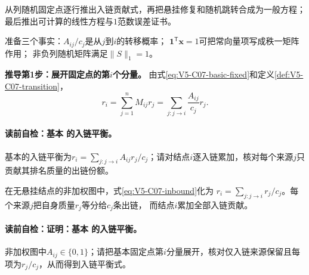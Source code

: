 \label{struct:V5-C07-CH11}

\begin{derivationgoalbox}
从列随机固定点逐行推出入链贡献式，再把悬挂修复和随机跳转合成为一般\PageRank{}方程；
最后推出可计算的线性方程与$1$范数误差证书。
\end{derivationgoalbox}
\begin{derivationprepbox}
准备三个事实：$A_{ij}/c_j$是从$j$到$i$的转移概率；
$\boldsymbol1^{\mathsf T}\boldsymbol x=1$可把常向量项写成秩一矩阵作用；
非负列随机矩阵满足$\|S\|_1=1$。
\end{derivationprepbox}

\textbf{推导第1步：展开固定点的第$i$个分量。}
由式\eqref{eq:V5-C07-basic-fixed}和定义\ref{def:V5-C07-transition}，
\begin{equation}
r_i=\sum_{j=1}^nM_{ij}r_j
=\sum_{j:j\to i}\frac{A_{ij}}{c_j}r_j.
\label{eq:V5-C07-inbound}
\end{equation}
\paragraph{读前自检：基本 的入链平衡。}基本\PageRank{}的入链平衡为$r_i=\sum_{j:j\to i}A_{ij}r_j/c_j$；请对结点$i$逐入链累加，核对每个来源$j$只贡献其排名质量的出链份额。\par

\begin{proposition}\label{prop:V5-C07-inbound-balance}
在无悬挂结点的非加权图中，式\eqref{eq:V5-C07-inbound}化为
$r_i=\sum_{j:j\to i}r_j/c_j$。每个来源$j$把自身质量$r_j$等分给$c_j$条出链，
而结点$i$累加全部入链贡献。
\end{proposition}
\paragraph{读前自检：证明：基本 的入链平衡。}非加权图中$A_{ij}\in\{0,1\}$；请把基本固定点第$i$分量展开，核对仅入链来源保留且每项为$r_j/c_j$，从而得到入链平衡式。\par

